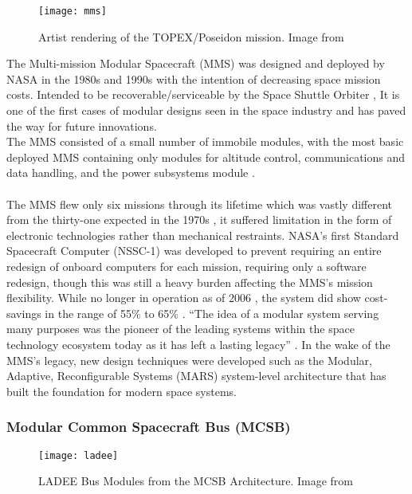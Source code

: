 \begin{wrapfigure}{r}{0.45\textwidth}
	\centering
	\vspace{-\baselineskip}
	
	\texttt{[image: mms]}
	\caption{Artist rendering of the TOPEX/Poseidon mission. Image from \cite{poseidonFacts}}
	\label{MMS}
\end{wrapfigure}
 The Multi-mission Modular Spacecraft (MMS) was designed and deployed by NASA in the 1980s and 1990s \cite{Esper2005ModularAR}  with the intention of decreasing space mission costs. Intended to be recoverable/serviceable by the Space Shuttle Orbiter \cite{NasaMMS},  It is one of the first cases of modular designs seen in the space industry and has paved the way for future innovations.
 \\
 The MMS consisted of a small number of immobile modules, with the most basic deployed MMS containing only modules for altitude control, communications and data handling, and the power subsystems module \cite{Esper2005ModularAR}. 
 \\\\
 The MMS flew only six missions through its lifetime which was vastly different from the thirty-one expected in the 1970s \cite{Esper2005ModularAR},  it suffered limitation in the form of electronic technologies rather than mechanical restraints. NASA’s first Standard Spacecraft Computer (NSSC-1) \cite{10.1145/358234.358252}  was developed to prevent requiring an entire redesign of onboard computers for each mission, requiring only a software redesign, though this was still a heavy burden affecting the MMS’s mission flexibility. While no longer in operation as of 2006 \cite{hupp2006nasa}, the system did show cost-savings in the range of 55\% to 65\% \cite{Esper2005ModularAR}. 
 “The idea of a modular system serving many purposes was the pioneer of the leading systems within the space technology ecosystem today as it has left a lasting legacy” \cite{Esper2005ModularAR}.  In the wake of the MMS’s legacy, new design techniques were developed such as the Modular, Adaptive, Reconfigurable Systems (MARS) system-level architecture \cite{Esper2005ModularAR} that has built the foundation for modern space systems.
 
\subsubsection{Modular Common Spacecraft Bus (MCSB)}
\begin{wrapfigure}{r}{0.4\textwidth}
	\centering
	\vspace{-\baselineskip}
	
	\texttt{[image: ladee]}
	\caption{LADEE Bus Modules from the MCSB Architecture. Image from \cite{5446989}}
	\label{LADEE}
\end{wrapfigure}

